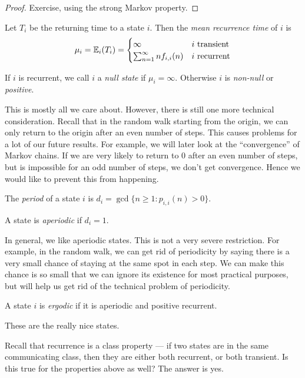 \documentclass[a4paper]{article}
\begin{document}
\begin{proof}
  Exercise, using the strong Markov property.
\end{proof}

\begin{defi}
  Let $T_i$ be the returning time to a state $i$. Then the \emph{mean recurrence time} of $i$ is
  \[
    \mu_i = \mathbb{E}_i(T_i) =
    \begin{cases}
      \infty & i\text{ transient}\\
      \sum_{n = 1}^\infty n f_{i, i}(n) & i\text{ recurrent}
    \end{cases}
  \]
\end{defi}

\begin{defi}
  If $i$ is recurrent, we call $i$ a \emph{null state} if $\mu_i = \infty$. Otherwise $i$ is \emph{non-null} or \emph{positive}.
\end{defi}

This is mostly all we care about. However, there is still one more technical consideration. Recall that in the random walk starting from the origin, we can only return to the origin after an even number of steps. This causes problems for a lot of our future results. For example, we will later look at the ``convergence'' of Markov chains. If we are very likely to return to $0$ after an even number of steps, but is impossible for an odd number of steps, we don't get convergence. Hence we would like to prevent this from happening.

\begin{defi}[Period]
  The \emph{period} of a state $i$ is $d_i = \gcd\{n \geq 1: p_{i, i}(n)> 0\}$.

  A state is \emph{aperiodic} if $d_i = 1$.
\end{defi}
In general, we like aperiodic states. This is not a very severe restriction. For example, in the random walk, we can get rid of periodicity by saying there is a very small chance of staying at the same spot in each step. We can make this chance is so small that we can ignore its existence for most practical purposes, but will help us get rid of the technical problem of periodicity.

\begin{defi}
  A state $i$ is \emph{ergodic} if it is aperiodic and positive recurrent.
\end{defi}
These are the really nice states.

Recall that recurrence is a class property --- if two states are in the same communicating class, then they are either both recurrent, or both transient. Is this true for the properties above as well? The answer is yes.
\end{document}
